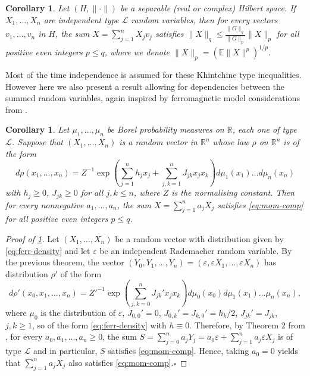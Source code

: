 \documentclass[10pt]{article}
\newcommand{\E}{\mathbb{E}}
\newcommand{\e}{\varepsilon}
\newcommand{\1}{\textbf{1}}
\newcommand{\R}{\mathbb{R}}
\newcommand{\sL}{\mathcal{L}}
\newtheorem{corollary}[theorem]{Corollary}
\theoremstyle{remark}
\theoremstyle{definition}
\begin{document}
\begin{corollary}
Let $(H,\|\cdot\|)$ be a separable (real or complex) Hilbert space. If $X_1, \ldots, X_n$ are independent type $\mathcal{L}$ random variables, then for every vectors $v_1, \ldots, v_n$ in $H$, the sum $X = \sum_{j=1}^n X_jv_j$ satisfies $\|X\|_q \leq \frac{\|G\|_q}{\|G\|_p}\|X\|_p$ for all positive even integers $p \leq q$, where we denote $\|X\|_p = (\E\|X\|^p)^{1/p}$.
\end{corollary}

Most of the time independence is assumed for these Khintchine type inequalities. However here we also present a result allowing for dependencies between the summed random variables, again inspired by ferromagnetic model considerations from \cite{GN}.

\begin{corollary}\label{cor:ferr}
Let $\mu_1, ..., \mu_n$ be Borel probability measures on $\R$, each one of type $\mathcal{L}$. Suppose that $(X_1,\dots,X_n)$ is a random vector in $\R^n$ whose law $\rho$ on $\R^n$ is of the form
\begin{equation}\label{eq:ferr-density}
d\rho(x_1,\ldots,x_n) = Z^{-1}\exp\left(\sum_{j=1}^n h_jx_j+\sum_{j,k=1}^n J_{jk}x_jx_k\right)d\mu_1(x_1)\dots d\mu_n(x_n)
\end{equation}
with $h_j \geq 0$, $J_{jk} \geq 0$ for all $j,k \leq n$, where $Z$ is the normalising constant. Then for every nonnegative $a_1, \ldots, a_n$, the sum $X = \sum_{j=1}^n a_jX_j$ satisfies \eqref{eq:mom-comp} for all positive even integers $p \leq q$.
\end{corollary}

\begin{proof}[Proof of \ref{cor:ferr}]
	Let $(X_1, \ldots, X_n)$ be a random vector with distribution given by \eqref{eq:ferr-density} and let $\varepsilon$ be an independent Rademacher random variable. By the previous theorem, the vector $(Y_0,Y_1,\dots,Y_n) = (\e,\e X_1,\dots,\e X_n)$ has distribution $\rho'$ of the form
\[
d\rho'(x_0,x_1,\ldots,x_n) = Z'^{-1}\exp\left(\sum_{j,k=0}^n J_{jk}'x_jx_k\right)d\mu_0(x_0)d\mu_1(x_1)\dots\mu_n(x_n),
\]
where $\mu_0$ is the distribution of $\varepsilon$, $J_{0,0}' = 0$, $J_{0,k}' = J_{k,0}'= h_k/2$, $J_{jk}' = J_{jk}$, $j,k \geq 1$, so of the form \eqref{eq:ferr-density} with $h \equiv 0$. Therefore, by Theorem 2 from \cite{N}, for every $a_0, a_1,\dots, a_n \geq 0$, the sum $S = \sum_{j=0}^n a_jY_j = a_0\e + \sum_{j=1}^n a_j\e X_j$ is of type $\sL$ and in particular, $S$ satisfies \eqref{eq:mom-comp}. Hence, taking $a_0 = 0$ yields that $\sum_{j=1}^n a_jX_j$ also satisfies \eqref{eq:mom-comp}.\hfill$\square$
\end{proof}
\end{document}
